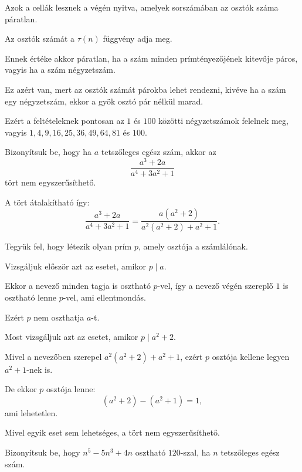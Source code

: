 \begin{solution}
Azok a cellák lesznek a végén nyitva, amelyek sorszámában az osztók
száma páratlan.

Az osztók számát a $\tau(n)$ függvény adja meg.

Ennek értéke akkor páratlan, ha a szám minden prímtényezőjének kitevője
páros, vagyis ha a szám négyzetszám.

Ez azért van, mert az osztók számát párokba lehet rendezni, kivéve
ha a szám egy négyzetszám, ekkor a gyök osztó pár nélkül marad.

Ezért a feltételeknek pontosan az $1$ és $100$ közötti négyzetszámok
felelnek meg, vagyis $1,4,9,16,25,36,49,64,81$ és $100$. 
\end{solution}
\begin{problem}
Bizonyítsuk be, hogy ha $a$ tetszőleges egész szám, akkor az 
\[
\frac{a^{3}+2a}{a^{4}+3a^{2}+1}
\]
tört nem egyszerűsíthető. 
\end{problem}

\begin{solution}
A tört átalakítható így: 
\[
\frac{a^{3}+2a}{a^{4}+3a^{2}+1}=\frac{a(a^{2}+2)}{a^{2}(a^{2}+2)+a^{2}+1}.
\]

Tegyük fel, hogy létezik olyan prím $p$, amely osztója a számlálónak.

Vizsgáljuk először azt az esetet, amikor $p\mid a$.

Ekkor a nevező minden tagja is osztható $p$-vel, így a nevező végén
szereplő $1$ is osztható lenne $p$-vel, ami ellentmondás.

Ezért $p$ nem oszthatja $a$-t.

\vspace{0.5em}

Most vizsgáljuk azt az esetet, amikor $p\mid a^{2}+2$.

Mivel a nevezőben szerepel $a^{2}(a^{2}+2)+a^{2}+1$, ezért $p$ osztója
kellene legyen $a^{2}+1$-nek is.

De ekkor $p$ osztója lenne: 
\[
(a^{2}+2)-(a^{2}+1)=1,
\]
ami lehetetlen.

\vspace{0.5em}

Mivel egyik eset sem lehetséges, a tört nem egyszerűsíthető. 
\end{solution}
\begin{problem}
Bizonyítsuk be, hogy $n^{5}-5n^{3}+4n$ osztható $120$-szal, ha $n$
tetszőleges egész szám. 
\end{problem}

